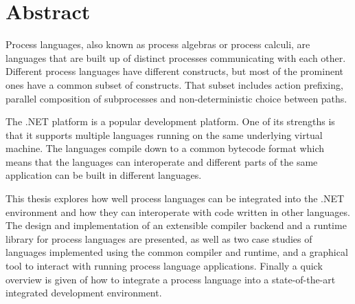 \chapter{Abstract}

	Process languages, also known as process algebras or process calculi, are 
	languages that are built up of distinct processes communicating with each 
	other. Different process languages have different constructs, but most of 
	the prominent ones have a common subset of constructs. That subset includes 
	action prefixing, parallel composition of subprocesses and non-deterministic 
	choice between paths.

	The .NET platform is a popular development platform. One of its strengths is
	that it supports multiple languages running on the same underlying virtual 
	machine. The languages compile down to a common bytecode format which means 
	that the languages can interoperate and different parts of the same 
	application can be built in different languages.

	This thesis explores how well process languages can be integrated into the 
	.NET environment and how they can interoperate with code written in other 
	languages.  The design and implementation of an extensible compiler backend 
	and a runtime library for process languages are presented, as well as two 
	case studies of languages implemented using the common compiler and runtime,
	and a graphical tool to interact with running process language applications. 
	Finally a quick overview is given of how to integrate a process language 
	into a state-of-the-art integrated development environment.